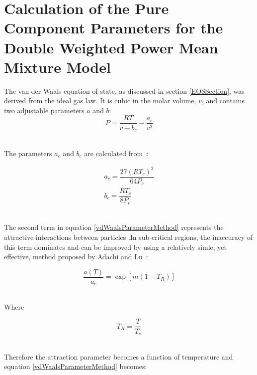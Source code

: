 
\section{Calculation of the Pure Component Parameters for the Double Weighted Power Mean Mixture Model}\label{PureComponentParameterCalcSection}
			
The van der Waals equation of state, as discussed in section \ref{EOSSection}, was derived from the ideal gas law. It is cubic in the molar volume, $v$, and contains two adjustable parameters $a$ and $b$:\\

\begin{equation}
P  = \dfrac{RT}{v - b_{c}} - \dfrac{a_{c}}{v^{2}} \label{vdWaalsParameterMethod}
\end{equation}\

The parameters $a_{c}$ and $b_{c}$ are calculated from~\cite{ThermophysicalProperties}:\

\begin{eqnarray}
a_{c} = \dfrac{27 \left( RT_{c} \right) ^{2}}{64P_{c}} \label{acParameterMethod}\\
b_{c} = \dfrac{ RT_{c}}{8P_{c}} \label{bcParameterMethod}\
\end{eqnarray}\

The second term in equation \ref{vdWaalsParameterMethod} represents the attractive interactions between particles .In sub-critical regions, the inaccuracy of this term dominates and can be improved by using a relatively simle, yet effective, method proposed by Adachi and Lu~\cite{Adachi-Lu}:\

\begin{equation}
\dfrac{a\left(T\right)}{a_{c}}= \exp \left[m\left(1-T_{R}\right)\right] \label{aTParameterMethod}
\end{equation}\

Where\

\begin{equation}
T_{R} = \dfrac{T}{T_{c}}
\end{equation}\

Therefore the attraction parameter becomes a function of temperature and equation \ref{vdWaalsParameterMethod} becomes:\


